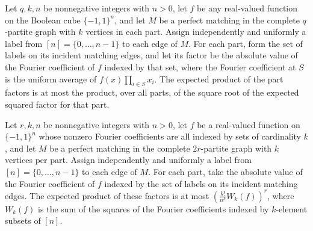 \begin{theorem}
\label{FABL.graphMatching_finner}
\leanok
{}
Let $q,k,n$ be nonnegative integers with $n>0$, let $f$ be any real-valued function on
the Boolean cube $\{-1,1\}^n$, and let $M$ be a perfect matching in the complete
$q$-partite graph with $k$ vertices in each part. Assign independently and uniformly a
label from $[n]=\{0,\ldots,n-1\}$ to each edge of $M$. For each part, form the set of
labels on its incident matching edges, and let its factor be the absolute value of the
Fourier coefficient of $f$ indexed by that set, where the Fourier coefficient at $S$ is
the uniform average of $f(x)\prod_{i\in S}x_i$. The expected product of the part factors
is at most the product, over all parts, of the square root of the expected squared
factor for that part.
\end{theorem}

\begin{theorem}
\label{FABL.graphMatching_fixed_expect_le}
\leanok
{}
Let $r,k,n$ be nonnegative integers with $n>0$, let $f$ be a real-valued function on
$\{-1,1\}^n$ whose nonzero Fourier coefficients are all indexed by sets of cardinality
$k$, and let $M$ be a perfect matching in the complete $2r$-partite graph with $k$
vertices per part. Assign independently and uniformly a label from
$[n]=\{0,\ldots,n-1\}$ to each edge of $M$. For each part, take the absolute value of
the Fourier coefficient of $f$ indexed by the set of labels on its incident matching
edges. The expected product of these factors is at most
$\left(\frac{k!}{n^k}W_k(f)\right)^r$, where $W_k(f)$ is the sum of the squares of the
Fourier coefficients indexed by $k$-element subsets of $[n]$.
\end{theorem}

